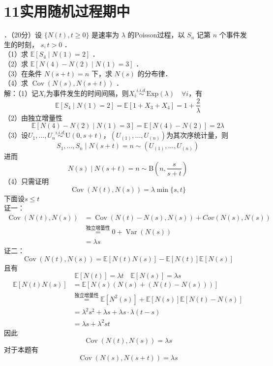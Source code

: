 \documentclass[UTF8,openany]{book}
\begin{document}
\section{\centering 11实用随机过程期中}
．（20分）设 $\{N(t), t \geq 0\}$ 是速率为 $\lambda$ 的Poisson过程，以 $S_{n}$ 记第 $n$ 个事件发生的时刻， $s, t>0$ ．\\
（1）求 $\mathbb{E}\left[S_{4} \mid N(1)=2\right]$ ．\\
（2）求 $\mathbb{E}[N(4)-N(2) \mid N(1)=3]$ ．\\
（3）在条件 $N(s+t)=n$ 下，求 $N(s)$ 的分布律．\\
（4）求 $\operatorname{Cov}(N(s), N(s+t))$ ．\\
解：（1）记$X_i$为事件发生的时间间隔，则$X_i\stackrel{i.i.d.}{\sim}\mathrm{Exp}(\lambda) \quad \forall i$，有
\[
\mathbb{E}\left[S_{4} \mid N(1)=2\right]=\mathbb{E}[1+X_3+X_4]=1+\frac{2}{\lambda}
\]
（2）由独立增量性
\[
\mathbb{E}[N(4)-N(2) \mid N(1)=3]=\mathbb{E}[N(4)-N(2) ]=2\lambda
\]
（3）设$U_1,...,U_n\stackrel{i.i.d.}{\sim}\mathrm{U}(0,s+t)$，$(U_{(1)},...,U_{(n)})$为其次序统计量，则
\[
S_1,...,S_n\mid N(s+t)=n  \sim (U_{(1)},...,U_{(n)})
\]
进而
\[
N(s)\mid N(s+t)=n \sim \mathrm{B}\left(n,\frac{s}{s+t} \right) 
\]
（4）只需证明
\[
\operatorname{Cov}\left(N(t),N(s) \right)=\lambda \min \{s,t\} 
\]
下面设$s\le t$\\
证一：
\begin{align*}
	\operatorname{Cov}\left(N(t),N(s) \right) &= \operatorname{Cov}\left(N(t)-N(s),N(s) \right)+Cov\left(N(s),N(s) \right)   \\
	&\stackrel{\text{独立增量性}}{=}0+\operatorname{Var}\left(N(s) \right) \\
	&=\lambda s
\end{align*}
证二：
\[
\operatorname{Cov}\left(N(t),N(s) \right)=\mathbb{E}\left[N(t)N(s) \right]-\mathbb{E}[N(t)]\mathbb{E}[N(s)] 
\]
且有
\[
\mathbb{E}[N(t)]=\lambda t \quad \mathbb{E}[N(s)]=\lambda s
\]
\begin{align*}
	\mathbb{E}\left[N(t)N(s) \right] & =\mathbb{E}\left[N(s)\left(N(s)+\left(N(t)-N(s) \right)  \right)  \right] \\
	& \stackrel{\text{独立增量性}}{=} \mathbb{E}\left[N^2(s) \right]+\mathbb{E}[N(s)]\mathbb{E}[N(t)-N(s)]\\
	&= \lambda^2 s^2+\lambda s + \lambda s \cdot \lambda(t-s)\\
	&=\lambda s +\lambda^2 st
\end{align*}
因此
\[
\operatorname{Cov}\left(N(t),N(s) \right)=\lambda s
\]
对于本题有
\[
\operatorname{Cov}(N(s), N(s+t))=\lambda s
\]\\
\end{document}
